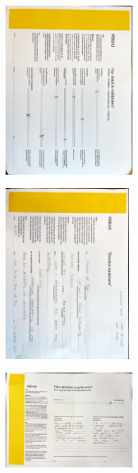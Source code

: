 \documentclass{article}
\begin{document}
\begin{figure}[htp]
    \centering
    \includegraphics[width = 180px,angle=90]{SM.jpg}
    \label{fig:24}
\end{figure}

\begin{figure}[htp]
    \centering
    \includegraphics[width = 175px,angle=90]{Elev.jpg}
    \label{fig:24}
\end{figure}

\begin{figure}[htp]
    \centering
    \includegraphics[width = 180px,angle=90]{MP.jpg}
    \label{fig:24}
\end{figure}






\end{document}
